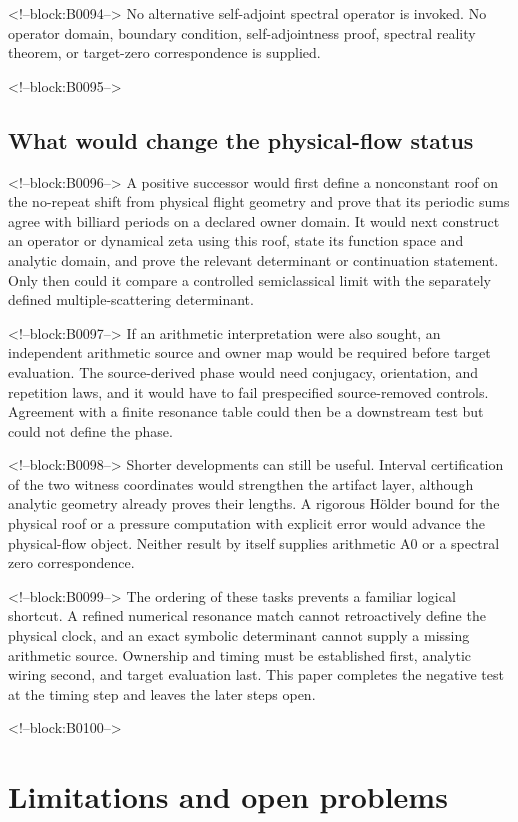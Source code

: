 \documentclass[11pt,a4paper]{article}
\theoremstyle{definition}
\theoremstyle{remark}
\begin{document}
<!--block:B0094-->
No alternative self-adjoint spectral operator is invoked. No operator domain, boundary condition, self-adjointness proof, spectral reality theorem, or target-zero correspondence is supplied.

<!--block:B0095-->
\subsection{What would change the physical-flow status}

<!--block:B0096-->
A positive successor would first define a nonconstant roof on the no-repeat shift from physical flight geometry and prove that its periodic sums agree with billiard periods on a declared owner domain. It would next construct an operator or dynamical zeta using this roof, state its function space and analytic domain, and prove the relevant determinant or continuation statement. Only then could it compare a controlled semiclassical limit with the separately defined multiple-scattering determinant.

<!--block:B0097-->
If an arithmetic interpretation were also sought, an independent arithmetic source and owner map would be required before target evaluation. The source-derived phase would need conjugacy, orientation, and repetition laws, and it would have to fail prespecified source-removed controls. Agreement with a finite resonance table could then be a downstream test but could not define the phase.

<!--block:B0098-->
Shorter developments can still be useful. Interval certification of the two witness coordinates would strengthen the artifact layer, although analytic geometry already proves their lengths. A rigorous Hölder bound for the physical roof or a pressure computation with explicit error would advance the physical-flow object. Neither result by itself supplies arithmetic A0 or a spectral zero correspondence.

<!--block:B0099-->
The ordering of these tasks prevents a familiar logical shortcut. A refined numerical resonance match cannot retroactively define the physical clock, and an exact symbolic determinant cannot supply a missing arithmetic source. Ownership and timing must be established first, analytic wiring second, and target evaluation last. This paper completes the negative test at the timing step and leaves the later steps open.

<!--block:B0100-->
\section{Limitations and open problems}
\end{document}
